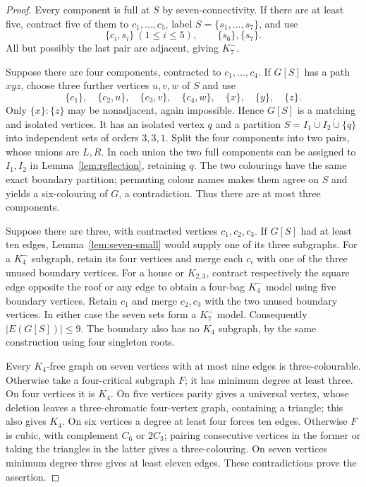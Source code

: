\begin{proof}
Every component is full at $S$ by seven-connectivity.  If there are at
least five, contract five of them to $c_1,\ldots,c_5$, label
$S=\{s_1,\ldots,s_7\}$, and use
\[
             \{c_i,s_i\}\ (1\leq i\leq5),\qquad\{s_6\},\{s_7\}.
\]
All but possibly the last pair are adjacent, giving $K_7^{-}$.

Suppose there are four components, contracted to $c_1,\ldots,c_4$.
If $G[S]$ has a path $xyz$, choose three further vertices $u,v,w$ of
$S$ and use
\[
 \{c_1\},\quad\{c_2,u\},\quad\{c_3,v\},\quad\{c_4,w\},
 \quad\{x\},\quad\{y\},\quad\{z\}.
\]
Only $\{x\}:\{z\}$ may be nonadjacent, again impossible.  Hence $G[S]$
is a matching and isolated vertices.  It has an isolated vertex $q$ and
a partition $S=I_1\mathbin{\dot\cup}I_2\mathbin{\dot\cup}\{q\}$ into
independent sets of orders $3,3,1$.  Split the four components into two
pairs, whose unions are $L,R$.  In each union the two full components
can be assigned to $I_1,I_2$ in Lemma~\ref{lem:reflection}, retaining
$q$.  The two colourings have the same exact boundary partition;
permuting colour names makes them agree on $S$ and yields a six-colouring
of $G$, a contradiction.  Thus there are at most three components.

Suppose there are three, with contracted vertices $c_1,c_2,c_3$.
If $G[S]$ had at least ten edges, Lemma~\ref{lem:seven-small} would
supply one of its three subgraphs.  For a $K_4^{-}$ subgraph, retain its
four vertices and merge each $c_i$ with one of the three unused boundary
vertices.  For a house or $K_{2,3}$, contract respectively the square
edge opposite the roof or any edge to obtain a four-bag $K_4^{-}$ model
using five boundary vertices.  Retain $c_1$ and merge $c_2,c_3$ with the
two unused boundary vertices.  In either case the seven sets form a
$K_7^{-}$ model.  Consequently $|E(G[S])|\leq9$.  The boundary also has
no $K_4$ subgraph, by the same construction using four singleton roots.

Every $K_4$-free graph on seven vertices with at most nine edges is
three-colourable.  Otherwise take a four-critical subgraph $F$; it has
minimum degree at least three.  On four vertices it is $K_4$.  On five
vertices parity gives a universal vertex, whose deletion leaves a
three-chromatic four-vertex graph, containing a triangle; this also gives
$K_4$.  On six vertices a degree at least four forces ten edges.  Otherwise
$F$ is cubic, with complement $C_6$ or $2C_3$; pairing consecutive
vertices in the former or taking the triangles in the latter gives a
three-colouring.  On seven vertices minimum degree three gives at least
eleven edges.  These contradictions prove the assertion.


\end{proof}
